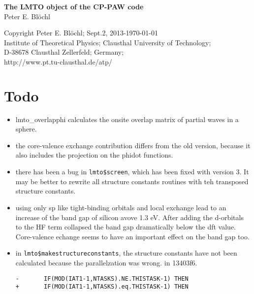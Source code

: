 \documentclass[11pt,a4paper]{report}
\begin{document}
\begin{titlepage}
\begin{center}
\vspace*{3.5cm}
{\huge \textbf{The LMTO object of the CP-PAW code}}\\
\vspace{0.5cm}
{\large Peter E. Bl\"ochl}
\vspace{0.5cm} 
\end{center}

\vfill
\begin{center}
Copyright Peter E. Bl\"ochl; Sept.2, 2013-\today\\
{\small
Institute of Theoretical Physics;
Clausthal University of Technology;\\ 
D-38678 Clausthal Zellerfeld; Germany;\\
http://www.pt.tu-clausthal.de/atp/}
\end{center}
\end{titlepage}
\noindent            
\tableofcontents
\chapter{Todo}
\begin{itemize}
\item lmto\_overlapphi calculates the onsite overlap matrix of partial
  waves in a sphere.
%
\item the core-valence exchange contribution differs from the old version,
  because it also includes the projection on the phidot functions.
%
\item there has been a bug in \verb|lmto$screen|, which has been fixed
  with version 3. It may be better to rewrite all structure constants
  routines with teh transposed structure constants.
%
\item using only sp like tight-binding orbitals and local exchange
  lead to an increase of the band gap of silicon avove 1.3 eV. After
  adding the d-orbitals to the HF term collapsed the band gap
  dramatically below the dft value. Core-valence echange seems to have
  an important effect on the band gap too.
%
\item in \verb|lmto$makestructureconstants|, the structure constants
  have not been calculated because the parallelzation was wrong.  in
  13403f6.
\begin{verbatim}
-       IF(MOD(IAT1-1,NTASKS).NE.THISTASK-1) THEN
+       IF(MOD(IAT1-1,NTASKS).eq.THISTASK-1) THEN
\end{verbatim}
\end{itemize}
\end{document}
